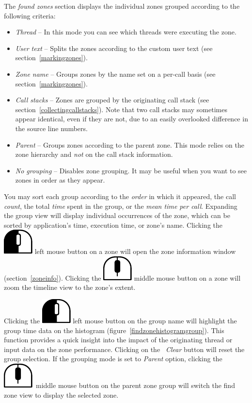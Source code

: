 \documentclass[hidelinks,titlepage,a4paper]{article}
\newcommand{\LMB}{\includegraphics[height=.8\baselineskip]{icons/lmb}}
\newcommand{\MMB}{\includegraphics[height=.8\baselineskip]{icons/mmb}}
\begin{document}
The \emph{found zones} section displays the individual zones grouped according to the following criteria:

\begin{itemize}
\item \emph{Thread} -- In this mode you can see which threads were executing the zone.
\item \emph{User text} -- Splits the zones according to the custom user text (see section~\ref{markingzones}).
\item \emph{Zone name} -- Groups zones by the name set on a per-call basis (see section~\ref{markingzones}).
\item \emph{Call stacks} -- Zones are grouped by the originating call stack (see section~\ref{collectingcallstacks}). Note that two call stacks may sometimes appear identical, even if they are not, due to an easily overlooked difference in the source line numbers.
\item \emph{Parent} -- Groups zones according to the parent zone. This mode relies on the zone hierarchy and \emph{not} on the call stack information.
\item \emph{No grouping} -- Disables zone grouping. It may be useful when you want to see zones in order as they appear.
\end{itemize}

You may sort each group according to the \emph{order} in which it appeared, the call \emph{count}, the total \emph{time} spent in the group, or the \emph{mean time per call}. Expanding the group view will display individual occurrences of the zone, which can be sorted by application's time, execution time, or zone's name. Clicking the \LMB{} left mouse button on a zone will open the zone information window (section~\ref{zoneinfo}). Clicking the \MMB{} middle mouse button on a zone will zoom the timeline view to the zone's extent.

Clicking the \LMB{} left mouse button on the group name will highlight the group time data on the histogram (figure~\ref{findzonehistogramgroup}). This function provides a quick insight into the impact of the originating thread or input data on the zone performance. Clicking on the \emph{\faBackspace~Clear} button will reset the group selection. If the grouping mode is set to \emph{Parent} option, clicking the \MMB{}~middle mouse button on the parent zone group will switch the find zone view to display the selected zone.
\end{document}
